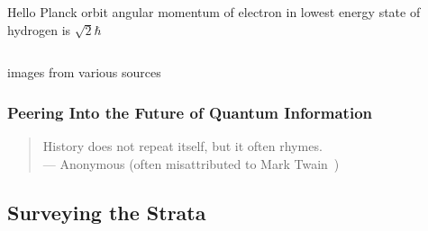 \documentclass[handout]{beamer}
\begin{document}
\begin{frame}
\begin{columns}
    \begin{block}{Hello Planck}
      orbit angular momentum of electron in lowest energy state of hydrogen
      is $\sqrt{2} \hbar$
    \end{block}
  \end{columns}

  images from various sources~\cite{CHM-Transistor-article, Lost-history-transistor, NRL-nanoelectronics,
    PhysOrg-3nm-channel-transistor, NIST-Single-electron-transport}
\end{frame}

\begin{frame}
  \frametitle{Peering Into the Future of Quantum Information}
  \mbox{}%
  \vfill
  \begin{quote}
    History does not repeat itself, but it often rhymes. \\%
    \mbox{}\hfill --- Anonymous (often misattributed to Mark Twain~\cite{QI-History-Rhymes})
  \end{quote}
  \vfill %
  \mbox{}
\end{frame}

\subsection{Surveying the Strata}
\end{document}
